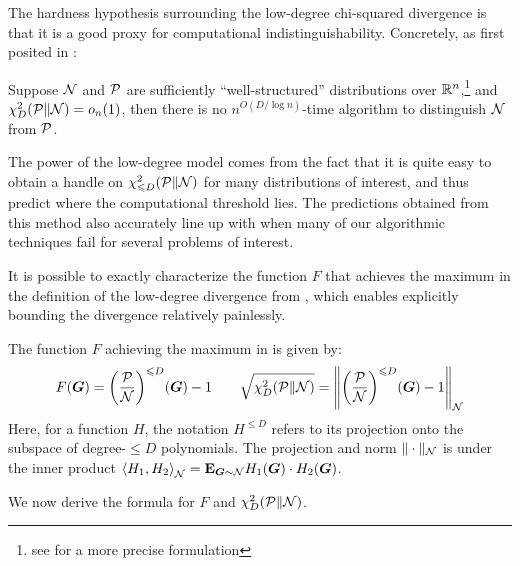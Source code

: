 \documentclass[11pt, letterpaper]{article}
\newcommand{\Null}{\calN}
\newcommand{\Planted}{\calP}
\begin{document}
The hardness hypothesis surrounding the low-degree chi-squared divergence is that it is a good proxy for computational indistinguishability.
Concretely, as first posited in \cite{HS17}:
\begin{displayquote}
    Suppose $\Null$ and $\Planted$ are sufficiently ``well-structured'' distributions over $\mathbb R^n$,\footnote{see \cite{Hop18} for a more precise formulation} and $\chi^2_D(\Planted\|\Null) = o_n(1)$, then there is no $n^{O(D/\log n)}$-time algorithm to distinguish $\Null$ from $\Planted$.
\end{displayquote}

The power of the low-degree model comes from the fact that it is quite easy to obtain a handle on $\chi^2_{\le D}(\Planted\|\Null)$ for many distributions of interest, and thus predict where the computational threshold lies.
The predictions obtained from this method also accurately line up with when many of our algorithmic techniques fail for several problems of interest.

It is possible to exactly characterize the function $F$ that achieves the maximum in the definition of the low-degree divergence from , which enables explicitly bounding the divergence relatively painlessly.

\begin{tcolorbox}[arc=3mm,colback=White,coltext=Black,boxrule=1pt]
\begin{theorem} \label{thm:low-degree-formula}
\hypersetup{linkcolor=Fuchsia}
The function $F$ achieving the maximum in {} is given by:
\[
    F(\bG) = \parens*{ \frac{\Planted}{\Null} }^{\le D}(\bG) - 1 \qquad \sqrt{\chi^2_D(\Planted\|\Null)} = \norm*{ \parens*{ \frac{\Planted}{\Null} }^{\le D}(\bG) - 1 }_{\Null}
\]
Here, for a function $H$, the notation $H^{\le D}$ refers to its projection onto the subspace of degree-$\le D$ polynomials.
The projection and norm $\|\cdot\|_{\Null}$ is under the inner product $\angles*{H_1,H_2}_{\Null} = \E_{\bG\sim\Null} H_1(\bG)\cdot H_2(\bG)$.
\end{theorem}
\hypersetup{linkcolor=RoyalBlue}
\end{tcolorbox}

We now derive the formula for $F$ and $\chi^2_D(\Planted\|\Null)$.
\end{document}
